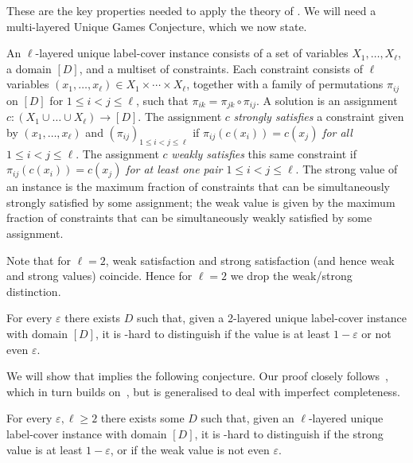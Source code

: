 \documentclass[a4paper,11pt, DIV=11]{scrartcl}
\renewcommand{\epsilon}{\varepsilon}
\theoremstyle{plain}
\theoremstyle{definition}
\begin{document}
These are the key properties needed to apply the theory of \cite{Dinur09:sicomp}. We will need a multi-layered Unique Games Conjecture, which we now state.

\begin{definition}\label{def:layered}
    An $\ell$-layered unique label-cover instance consists of a set of variables
    $X_1, \ldots, X_\ell$, a domain $[D]$, and a multiset of constraints. Each
    constraint consists of $\ell$ variables $(x_1, \ldots, x_\ell) \in X_1
    \times \cdots \times X_\ell$, together with a family of permutations
    $\pi_{ij}$ on $[D]$ for $1 \leq i < j \leq \ell$, such that $\pi_{ik} =
    \pi_{jk} \circ \pi_{ij}$. A solution is an assignment $c : (X_1  \cup \ldots
    \cup X_\ell) \to [D]$. The assignment $c$ \emph{strongly satisfies} a
    constraint given by $(x_1, \ldots, x_{\ell})$ and $(\pi_{ij})_{1 \leq i < j
    \leq \ell}$ if $\pi_{ij}(c(x_i)) = c(x_j)$ \emph{for all $1 \leq i < j \leq
    \ell$}. The assignment $c$ \emph{weakly satisfies} this same constraint if
    $\pi_{ij}(c(x_i)) = c(x_j)$ \emph{for at least one pair $1 \leq i < j \leq
    \ell$}. The strong value of an instance is the maximum fraction of
    constraints that can be simultaneously strongly satisfied by some
    assignment; the weak value is given by the maximum fraction of constraints
    that can be simultaneously weakly satisfied by some assignment.
\end{definition}

Note that for $\ell = 2$, weak satisfaction and strong satisfaction (and hence weak and strong values) coincide. Hence for $\ell = 2$ we drop the weak/strong distinction.

\begin{conjecture}\label{conj:UGC}
For every $\epsilon$ there exists $D$ such that, given a 2-layered unique label-cover instance with domain $[D]$, it is \NP-hard to distinguish if the value is at least $1 - \epsilon$ or not even $\epsilon$.
\end{conjecture}

We will show that  implies the following conjecture. Our proof
closely follows~\cite{BWZ21}, which in turn builds on~\cite{DinurGKR05}, but is generalised to deal with imperfect completeness.

\begin{conjecture}\label{conj:mulUGC}
For every $\epsilon, \ell \geq 2$ there exists some $D$ such that, given an $\ell$-layered unique label-cover instance with domain $[D]$, it is \NP-hard to distinguish if the strong value is at least $1 - \epsilon$, or if the weak value is not even $\epsilon$.
\end{conjecture}
\end{document}
